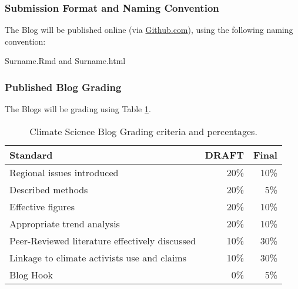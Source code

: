 
\subsubsection{Submission Format and Naming Convention}

The Blog will be published online (via \url{Github.com}), using the following naming convention: 

\begin{center}
Surname.Rmd and Surname.html
\end{center}

\subsubsection{Published Blog Grading}

The Blogs will be grading using Table \ref{tab:bloggrading}. 

\begin{table}[h]
\caption{Climate Science Blog Grading criteria and percentages.}
\label{tab:bloggrading}
\begin{tabular}{lrr}\hline
Standard              &   DRAFT   & Final \\ \hline\hline
Regional issues introduced     & 20\%    & 10\% \\
Described methods             & 20\%    & 5\% \\
Effective figures             & 20\%    & 10\% \\
Appropriate trend analysis    & 20\%    & 10\% \\
Peer-Reviewed literature effectively discussed & 10\% & 30\%\\
Linkage to climate activists use and claims    & 10\% & 30\%\\
Blog Hook                                      & 0\%  & 5\%\\
\hline
\end{tabular}
\end{table}

